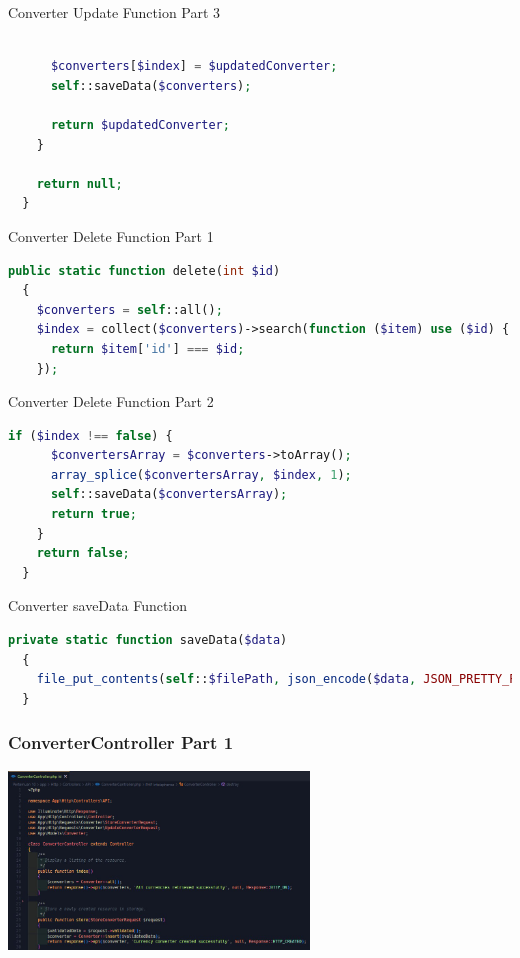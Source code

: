 \documentclass[aspectratio=169, table]{beamer}
\begin{document}
\begin{frame}[fragile]{Converter Update Function Part 3}
\vskip1cm
\begin{lstlisting}[language=PHP]

      $converters[$index] = $updatedConverter;
      self::saveData($converters);

      return $updatedConverter;
    }

    return null;
  }
\end{lstlisting}
\end{frame}

\begin{frame}[fragile]{Converter Delete Function Part 1}
\vskip1cm
\begin{lstlisting}[language=PHP]
  public static function delete(int $id)
  {
    $converters = self::all();
    $index = collect($converters)->search(function ($item) use ($id) {
      return $item['id'] === $id;
    });

\end{lstlisting}
\end{frame}

\begin{frame}[fragile]{Converter Delete Function Part 2}
\vskip1cm
\begin{lstlisting}[language=PHP]
    if ($index !== false) {
      $convertersArray = $converters->toArray();
      array_splice($convertersArray, $index, 1);
      self::saveData($convertersArray);
      return true;
    }
    return false;
  }
\end{lstlisting}
\end{frame}

\begin{frame}[fragile]{Converter saveData Function}
\vskip1cm
\begin{lstlisting}[language=PHP]
private static function saveData($data)
  {
    file_put_contents(self::$filePath, json_encode($data, JSON_PRETTY_PRINT));
  }
\end{lstlisting}
\end{frame}

\begin{frame}[fragile]
 \frametitle{ConverterController Part 1}
 \vskip1cm
 \begin{center}
  \includegraphics[width=0.6\textwidth]{classFiles/pertemuan-10-controller-part-1.png}
 \end{center}
\end{frame}
\end{document}
